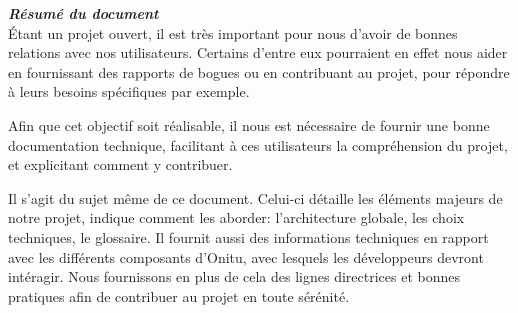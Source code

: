\thispagestyle{empty}
\vspace*{10mm}

\textbf{\emph{\textcolor{onitu}{\large{Résumé du document} } } }\\

Étant un projet ouvert, il est très important pour nous d'avoir de bonnes relations avec nos utilisateurs. Certains d'entre eux pourraient en effet nous aider en fournissant des rapports de bogues ou en contribuant au projet, pour répondre à leurs besoins spécifiques par exemple.

Afin que cet objectif soit réalisable, il nous est nécessaire de fournir une bonne documentation technique, facilitant à ces utilisateurs la compréhension du projet, et explicitant comment y contribuer.

Il s'agit du sujet même de ce document. Celui-ci détaille les éléments majeurs de notre projet, indique comment les aborder: l'architecture globale, les choix techniques, le glossaire. Il fournit aussi des informations techniques  en rapport avec les différents composants d'Onitu, avec lesquels les développeurs devront intéragir. Nous fournissons en plus de cela des lignes directrices et bonnes pratiques afin de contribuer au projet en toute sérénité.

\clearpage
